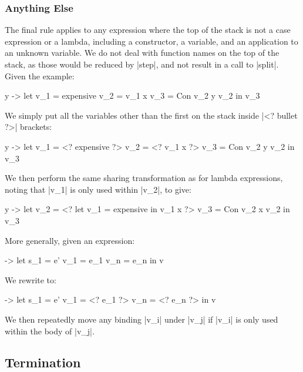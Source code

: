 \documentclass[draft]{sigplanconf}
\begin{document}
\subsubsection{Anything Else}
\label{sec:eval_split_other}

The final rule applies to any expression where the top of the stack is not a case expression or a lambda, including a constructor, a variable, and an application to an unknown variable. We do not deal with function names on the top of the stack, as those would be reduced by |step|, and not result in a call to |split|. Given the example:

\begin{code}
\x y ->  let  v_1 = expensive
              v_2 = v_1 x
              v_3 = Con v_2 y v_2
         in   v_3
\end{code}

We simply put all the variables other than the first on the stack inside |<? bullet ?>| brackets:

\begin{code}
\x y ->  let  v_1 = <? expensive ?>
              v_2 = <? v_1 x ?>
              v_3 = Con v_2 y v_2
         in   v_3
\end{code}

We then perform the same sharing transformation as for lambda expressions, noting that |v_1| is only used within |v_2|, to give:

\begin{code}
\x y ->  let  v_2 = <? let v_1 = expensive in v_1 x ?>
              v_3 = Con v_2 x v_2
         in   v_3
\end{code}

More generally, given an expression:

\begin{code}
\free ->  let  s_1 = e'
               v_1 = e_1
               v_n = e_n
          in   v
\end{code}

We rewrite to:

\begin{code}
\free ->  let  s_1 = e'
               v_1 = <? e_1 ?>
               v_n = <? e_n ?>
          in   v
\end{code}

We then repeatedly move any binding |v_i| under |v_j| if |v_i| is only used within the body of |v_j|.

\subsection{Termination}
\label{sec:term}
\end{document}

